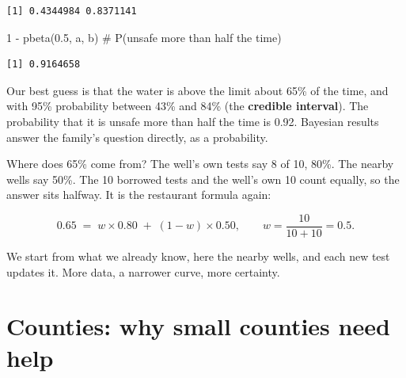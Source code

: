 \documentclass[
  letterpaper,
  DIV=11,
  numbers=noendperiod]{scrartcl}
\newenvironment{Shaded}{\begin{snugshade}}{\end{snugshade}}
\newcommand{\CommentTok}[1]{\textcolor[rgb]{0.37,0.37,0.37}{#1}}
\newcommand{\DecValTok}[1]{\textcolor[rgb]{0.68,0.00,0.00}{#1}}
\newcommand{\FloatTok}[1]{\textcolor[rgb]{0.68,0.00,0.00}{#1}}
\newcommand{\FunctionTok}[1]{\textcolor[rgb]{0.28,0.35,0.67}{#1}}
\newcommand{\NormalTok}[1]{\textcolor[rgb]{0.00,0.23,0.31}{#1}}
\newcommand{\SpecialCharTok}[1]{\textcolor[rgb]{0.37,0.37,0.37}{#1}}
\begin{document}
\begin{verbatim}
[1] 0.4344984 0.8371141
\end{verbatim}

\begin{Shaded}
\begin{Highlighting}[]
\DecValTok{1} \SpecialCharTok{{-}} \FunctionTok{pbeta}\NormalTok{(}\FloatTok{0.5}\NormalTok{, a, b)                             }\CommentTok{\# P(unsafe more than half the time)}
\end{Highlighting}
\end{Shaded}

\begin{verbatim}
[1] 0.9164658
\end{verbatim}

Our best guess is that the water is above the limit about 65\% of the
time, and with 95\% probability between 43\% and 84\% (the
\textbf{credible interval}). The probability that it is unsafe more than
half the time is 0.92. Bayesian results answer the family's question
directly, as a probability.

Where does 65\% come from? The well's own tests say 8 of 10, 80\%. The
nearby wells say 50\%. The 10 borrowed tests and the well's own 10 count
equally, so the answer sits halfway. It is the restaurant formula again:

\[
0.65 \;=\; w \times 0.80
\;+\; (1 - w) \times 0.50,
\qquad w = \frac{10}{10 + 10} = 0.5.
\]

\begin{tcolorbox}[enhanced jigsaw, colbacktitle=quarto-callout-tip-color!10!white, leftrule=.75mm, colframe=quarto-callout-tip-color-frame, bottomrule=.15mm, left=2mm, titlerule=0mm, title=\textcolor{quarto-callout-tip-color}{\faLightbulb}\hspace{0.5em}{Key idea}, rightrule=.15mm, bottomtitle=1mm, colback=white, toptitle=1mm, coltitle=black, arc=.35mm, breakable, toprule=.15mm, opacitybacktitle=0.6, opacityback=0]

We start from what we already know, here the nearby wells, and each new
test updates it. More data, a narrower curve, more certainty.

\end{tcolorbox}

\section{Counties: why small counties need
help}\label{counties-why-small-counties-need-help}
\end{document}
